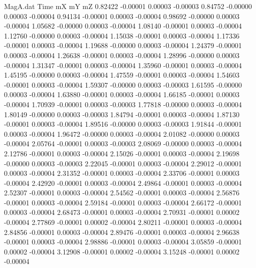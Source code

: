 \begin{filecontents}{MagA.dat}
Time mX mY mZ
   0.82422   -0.00001    0.00003   -0.00003
   0.84752   -0.00000    0.00003   -0.00004
   0.94134   -0.00001    0.00003   -0.00004
   0.98692   -0.00000    0.00003   -0.00004
   1.05682   -0.00000    0.00003   -0.00004
   1.08140   -0.00001    0.00003   -0.00004
   1.12760   -0.00000    0.00003   -0.00004
   1.15038   -0.00001    0.00003   -0.00004
   1.17336   -0.00001    0.00003   -0.00004
   1.19688   -0.00000    0.00003   -0.00004
   1.24379   -0.00001    0.00003   -0.00004
   1.26638   -0.00001    0.00003   -0.00004
   1.28996   -0.00000    0.00003   -0.00004
   1.31347   -0.00001    0.00003   -0.00004
   1.35960   -0.00001    0.00003   -0.00004
   1.45195   -0.00000    0.00003   -0.00004
   1.47559   -0.00001    0.00003   -0.00004
   1.54603   -0.00001    0.00003   -0.00004
   1.59307   -0.00000    0.00003   -0.00003
   1.61595   -0.00000    0.00003   -0.00004
   1.63880   -0.00001    0.00003   -0.00004
   1.66185   -0.00001    0.00003   -0.00004
   1.70939   -0.00001    0.00003   -0.00003
   1.77818   -0.00000    0.00003   -0.00004
   1.80149   -0.00000    0.00003   -0.00003
   1.84794   -0.00001    0.00003   -0.00004
   1.87130   -0.00001    0.00003   -0.00004
   1.89516   -0.00000    0.00003   -0.00003
   1.91844   -0.00001    0.00003   -0.00004
   1.96472   -0.00000    0.00003   -0.00004
   2.01082   -0.00000    0.00003   -0.00004
   2.05764   -0.00001    0.00003   -0.00003
   2.08069   -0.00000    0.00003   -0.00004
   2.12786   -0.00001    0.00003   -0.00004
   2.15026   -0.00001    0.00003   -0.00004
   2.19698   -0.00000    0.00003   -0.00003
   2.22045   -0.00001    0.00003   -0.00004
   2.29012   -0.00001    0.00003   -0.00004
   2.31352   -0.00001    0.00003   -0.00004
   2.33706   -0.00001    0.00003   -0.00004
   2.42920   -0.00001    0.00003   -0.00004
   2.49864   -0.00001    0.00003   -0.00004
   2.52307   -0.00001    0.00003   -0.00004
   2.54562   -0.00001    0.00003   -0.00004
   2.56876   -0.00001    0.00003   -0.00004
   2.59184   -0.00001    0.00003   -0.00004
   2.66172   -0.00001    0.00003   -0.00004
   2.68473   -0.00001    0.00003   -0.00004
   2.70931   -0.00001    0.00002   -0.00004
   2.77869   -0.00001    0.00002   -0.00004
   2.80211   -0.00001    0.00003   -0.00004
   2.84856   -0.00001    0.00003   -0.00004
   2.89476   -0.00001    0.00003   -0.00004
   2.96638   -0.00001    0.00003   -0.00004
   2.98886   -0.00001    0.00003   -0.00004
   3.05859   -0.00001    0.00002   -0.00004
   3.12908   -0.00001    0.00002   -0.00004
   3.15248   -0.00001    0.00002   -0.00004

\end{filecontents}
